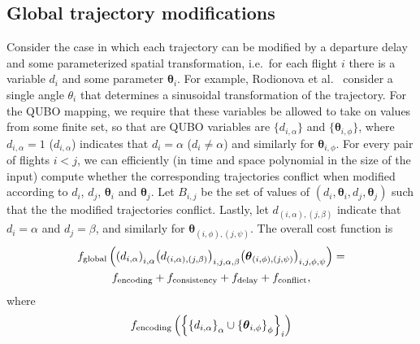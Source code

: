 \subsection{Global trajectory modifications}
Consider the case in which each trajectory can be modified by a departure delay and some parameterized spatial transformation, i.e.\ for each flight $i$ there is a variable $d_i$ and some parameter $\boldsymbol \theta_i$.
For example, Rodionova et al.~\cite{rodionova16} consider a single angle $\theta_i$ that determines a sinusoidal transformation of the trajectory.
For the QUBO mapping, we require that these variables be allowed to take on values from some finite set, so that are QUBO variables are $\{d_{i, \alpha}\}$ and $\{\boldsymbol \theta_{i,\phi}\}$, where $d_{i, \alpha} = 1$ ($d_{i, \alpha}$) indicates that $d_i = \alpha$ ($d_i \neq \alpha$) and similarly for $\boldsymbol \theta_{i, \phi}$.
For every pair of flights $i < j$, we can efficiently (in time and space polynomial in the size of the input) compute whether the corresponding trajectories conflict when modified according to $d_i$, $d_j$, $\boldsymbol \theta_i$ and $\boldsymbol \theta_j$.
Let $B_{i, j}$ be the set of values of $(d_i, \boldsymbol \theta_i, d_j, \boldsymbol \theta_j)$ such that the the modified trajectories conflict.
Lastly, let $d_{(i, \alpha), (j, \beta)}$ indicate that $d_i = \alpha$ and $ d_j = \beta$, and similarly for $\boldsymbol \theta_{(i, \phi), (j, \psi)}$.
The overall cost function is
\begin{multline}
f_{\mathrm{global}}
\left(
{\left(d_{i,\alpha}\right)}_{i,\alpha}
{\left(d_{(i,\alpha),(j,\beta)}\right)}_{i,j,\alpha,\beta}
{\left(\boldsymbol \theta_{(i,\phi),(j,\psi)}\right)}_{i,j,\phi,\psi}
\right)
=\\
f_{\mathrm{encoding}} +
f_{\mathrm{consistency}} +
f_{\mathrm{delay}} +
f_{\mathrm{conflict}},
\end{multline}
where 
\begin{equation}
f_{\mathrm{encoding}} \left(
{\left\{
{\left\{
d_{i, \alpha}
\right\}}_{\alpha}
\cup
{\left\{
\boldsymbol \theta_{i, \phi}
\right\}}_{\phi}
\right\}}_i
\right)
\end{equation}

